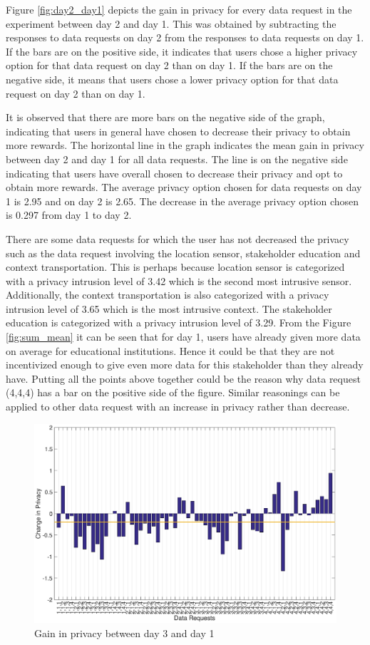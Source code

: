 Figure \ref{fig:day2_day1} depicts the gain in privacy for every data request in the experiment between day 2 and day 1. This was obtained by subtracting the responses to data requests on day 2 from the responses to data requests on day 1. If the bars are on the positive side, it indicates that users chose a higher privacy option for that data request on day 2 than on day 1. If the bars are on the negative side, it means that users chose a lower privacy option for that data request on day 2 than on day 1.

It is observed that there are more bars on the negative side of the graph, indicating that users in general have chosen to decrease their privacy to obtain more rewards. The horizontal line in the graph indicates the mean gain in privacy between day 2 and day 1 for all data requests. The line is on the negative side indicating that users have overall chosen to decrease their privacy and opt to obtain more rewards. The average privacy option chosen for data requests on day 1 is 2.95 and on day 2 is 2.65. The decrease in the average privacy option chosen is  0.297 from day 1 to day 2.

There are some data requests for which the user has not decreased the privacy such as the data request involving the location sensor, stakeholder education and context transportation. This is perhaps because location sensor is categorized with a privacy intrusion level of 3.42 which is the second most intrusive sensor. Additionally, the context transportation is also categorized with a privacy intrusion level of 3.65 which is the most intrusive context. The stakeholder education is categorized with a privacy intrusion level of 3.29. From the Figure \ref{fig:sum_mean} it can be seen that for day 1, users have already given more data on average for educational institutions. Hence it could be that they are not incentivized enough to give even more data for this stakeholder than they already have. Putting all the points above together could be the reason why data request (4,4,4) has a bar on the positive side of the figure. Similar reasonings can be applied to other data request with an increase in privacy rather than decrease.

\begin{figure}[ht!]
\centering
\includegraphics[width=\textwidth]{./images/day3_day1}
\caption{Gain in privacy between day 3 and day 1}
\label{fig:day3_day1}
\end{figure}

